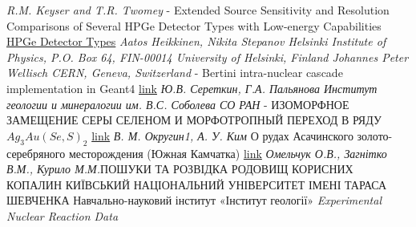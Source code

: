 \documentclass[a4paper, 14pt]{article}
\numberwithin{equation}{section}
\numberwithin{table}{section}
\begin{document}
\newpage	
\begin{thebibliography}{}
	
	 \textit{R.M. Keyser and T.R. Twomey} - Extended Source Sensitivity and Resolution Comparisons of Several HPGe Detector Types with Low-energy Capabilities \\
	\href{https://www.ortec-online.com/-/media/ametekortec/technical%20papers/high%20purity%20germanium%20detector%20applications%20and%20technology%20developements/extended-source-sensitivity-resolution-comparisons-several-hpge-detector-types-low-energy-capabilities.pdf?la=en}{ HPGe Detector Types}		
	 \textit{Aatos Heikkinen, Nikita Stepanov Helsinki Institute of Physics, P.O. Box 64, FIN-00014 University of Helsinki, Finland Johannes Peter Wellisch CERN, Geneva, Switzerland} - Bertini intra-nuclear cascade implementation in Geant4
	\href{https://www.slac.stanford.edu/econf/C0303241/proc/papers/MOMT008.PDF}{link}	
	 \textit{Ю.В. Сереткин, Г.А. Пальянова Институт геологии и минералогии им. В.С. Соболева СО РАН} - ИЗОМОРФНОЕ ЗАМЕЩЕНИЕ СЕРЫ СЕЛЕНОМ И МОРФОТРОПНЫЙ ПЕРЕХОД В РЯДУ $Ag_3Au(Se,S)_2$
	\href{https://www.sibran.ru/upload/iblock/478/478309021b63c0dc426e82c4025e6471.pdf}{link}	
	 \textit{В. М. Округин1, А. У. Ким} О рудах Асачинского золото-серебряного месторождения
	(Южная Камчатка)
	\href{http://www.kscnet.ru/ivs/publication/volc_day/2014/art51.pdf}{link}	
	 \textit{Омельчук О.В., Загнітко В.М., Курило М.М.}ПОШУКИ ТА РОЗВІДКА РОДОВИЩ КОРИСНИХ КОПАЛИН КИЇВСЬКИЙ НАЦІОНАЛЬНИЙ УНІВЕРСИТЕТ ІМЕНІ ТАРАСА ШЕВЧЕНКА Навчально-науковий інститут «Інститут геології»
	 \textit{Experimental Nuclear Reaction Data}
	
\end{thebibliography}
\end{document}
